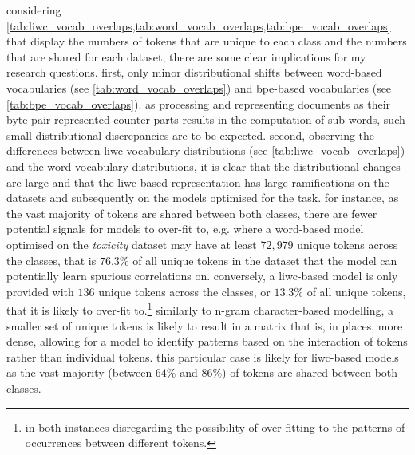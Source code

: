 \begin{table}[h]
\centering
{}
\caption{number of unique bpe tokens in each class for each dataset and the size of their intersection.}
\label{tab:bpe_vocab_overlaps}
\end{table}

considering \cref{tab:liwc_vocab_overlaps,tab:word_vocab_overlaps,tab:bpe_vocab_overlaps} that display the numbers of tokens that are unique to each class and the numbers that are shared for each dataset, there are some clear implications for my research questions.
first, only minor distributional shifts between word-based vocabularies (see \cref{tab:word_vocab_overlaps}) and bpe-based vocabularies (see \cref{tab:bpe_vocab_overlaps}).
as processing and representing documents as their byte-pair represented counter-parts results in the computation of sub-words, such small distributional discrepancies are to be expected.
second, observing the differences between liwc vocabulary distributions (see \cref{tab:liwc_vocab_overlaps}) and the word vocabulary distributions, it is clear that the distributional changes are large and that the liwc-based representation has large ramifications on the datasets and subsequently on the models optimised for the task.
for instance, as the vast majority of tokens are shared between both classes, there are fewer potential signals for models to over-fit to, e.g. where a word-based model optimised on the \textit{toxicity} dataset may have at least $72,979$ unique tokens across the classes, that is $76.3\%$ of all unique tokens in the dataset that the model can potentially learn spurious correlations on.
conversely, a liwc-based model is only provided with $136$ unique tokens across the classes, or $13.3\%$ of all unique tokens, that it is likely to over-fit to.\footnote{in both instances disregarding the possibility of over-fitting to the patterns of occurrences between different tokens.}
similarly to n-gram character-based modelling, a smaller set of unique tokens is likely to result in a matrix that is, in places, more dense, allowing for a model to identify patterns based on the interaction of tokens rather than individual tokens.
this particular case is likely for liwc-based models as the vast majority (between $64\%$ and $86\%$) of tokens are shared between both classes.

